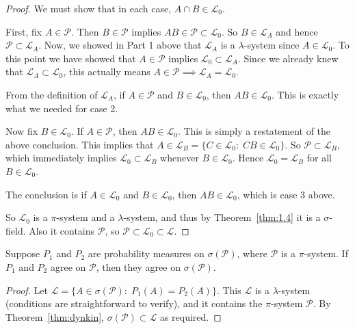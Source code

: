 \documentclass[11pt,fleqn]{book} %
\begin{document}
\begin{proof}
	We must show that in each case, $A \cap B \in \mathcal{L}_0$.

	First, fix $A \in \mathcal{P}$. Then $B \in \mathcal{P}$ implies $AB \in \mathcal{P} \subset \mathcal{L}_0$. So $B \in \mathcal{L}_A$ and hence $\mathcal{P} \subset \mathcal{L}_A$. Now, we showed in Part 1 above that $\mathcal{L}_A$ is a $\lambda$-system since $A \in \mathcal{L}_0$. To this point we have showed that $A \in \mathcal{P}$ implies $\mathcal{L}_0 \subset \mathcal{L}_A$. Since we already knew that $\mathcal{L}_A \subset \mathcal{L}_0$, this actually means $A \in \mathcal{P} \implies \mathcal{L}_A = \mathcal{L}_0$.

	From the definition of $\mathcal{L}_A$, if $A \in \mathcal{P}$ and $B \in \mathcal{L}_0$, then $AB \in \mathcal{L}_0$. This is exactly what we needed for case 2.

	Now fix $B \in \mathcal{L}_0$. If $A \in \mathcal{P}$, then $AB \in \mathcal{L}_0$. This is simply a restatement of the above conclusion. This implies that $A \in \mathcal{L}_B = \{C \in \mathcal{L}_0:\;CB \in \mathcal{L}_0\}$. So $\mathcal{P} \subset \mathcal{L}_B$, which immediately implies $\mathcal{L}_0 \subset \mathcal{L}_B$ whenever $B \in \mathcal{L}_0$. Hence $\mathcal{L}_0 = \mathcal{L}_B$ for all $B \in \mathcal{L}_0$.

	The conclusion is if $A \in \mathcal{L}_0$ and $B \in \mathcal{L}_0$, then $AB \in \mathcal{L}_0$, which is case 3 above.

	\vspace{10pt}
	So $\mathcal{L}_0$ is a $\pi$-system and a $\lambda$-system, and thus by Theorem~\ref{thm:1.4} it is a $\sigma$-field. Also it contains $\mathcal{P}$, so $\mathcal{P} \subset \mathcal{L}_0 \subset \mathcal{L}$.
\end{proof}

\begin{theorem} \label{thm:uniqueness}
	Suppose $P_1$ and $P_2$ are probability measures on $\sigma(\mathcal{P})$, where $\mathcal{P}$ is a $\pi$-system. If $P_1$ and $P_2$ agree on $\mathcal{P}$, then they agree on $\sigma(\mathcal{P})$.
\end{theorem}

\begin{proof}
	Let $\mathcal{L} = \{A \in \sigma(\mathcal{P}):\;P_1(A) = P_2(A)\}$. This $\mathcal{L}$ is a $\lambda$-system (conditions are straightforward to verify), and it contains the $\pi$-system $\mathcal{P}$. By Theorem~\ref{thm:dynkin}, $\sigma(\mathcal{P}) \subset \mathcal{L}$ as required.
\end{proof}
\end{document}
